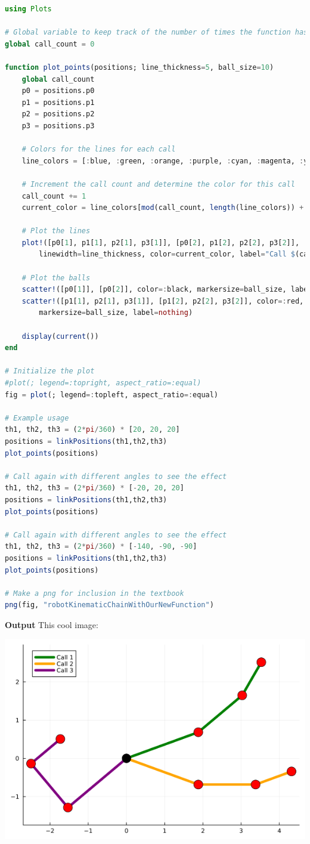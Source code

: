 \bigskip

\begin{lstlisting}[language=Julia,style=mystyle]
using Plots

# Global variable to keep track of the number of times the function has been called
global call_count = 0

function plot_points(positions; line_thickness=5, ball_size=10)
    global call_count
    p0 = positions.p0
    p1 = positions.p1
    p2 = positions.p2
    p3 = positions.p3
    
    # Colors for the lines for each call
    line_colors = [:blue, :green, :orange, :purple, :cyan, :magenta, :yellow, :black]
    
    # Increment the call count and determine the color for this call
    call_count += 1
    current_color = line_colors[mod(call_count, length(line_colors)) + 1]
    
    # Plot the lines
    plot!([p0[1], p1[1], p2[1], p3[1]], [p0[2], p1[2], p2[2], p3[2]], 
        linewidth=line_thickness, color=current_color, label="Call $(call_count)")
    
    # Plot the balls
    scatter!([p0[1]], [p0[2]], color=:black, markersize=ball_size, label=nothing)
    scatter!([p1[1], p2[1], p3[1]], [p1[2], p2[2], p3[2]], color=:red, 
        markersize=ball_size, label=nothing)
    
    display(current())
end

# Initialize the plot
#plot(; legend=:topright, aspect_ratio=:equal)
fig = plot(; legend=:topleft, aspect_ratio=:equal)

# Example usage
th1, th2, th3 = (2*pi/360) * [20, 20, 20]
positions = linkPositions(th1,th2,th3)
plot_points(positions)

# Call again with different angles to see the effect
th1, th2, th3 = (2*pi/360) * [-20, 20, 20]
positions = linkPositions(th1,th2,th3)
plot_points(positions)
        
# Call again with different angles to see the effect
th1, th2, th3 = (2*pi/360) * [-140, -90, -90]
positions = linkPositions(th1,th2,th3)
plot_points(positions)

# Make a png for inclusion in the textbook 
png(fig, "robotKinematicChainWithOurNewFunction")
\end{lstlisting}
\textbf{Output} This cool image:
\begin{center}
    \includegraphics[width=0.7\columnwidth]{graphics/Chap01/robotKinematicChainWithOurNewFunction.png}
\end{center}

